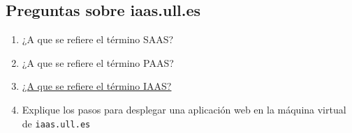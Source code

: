 \subsection{Preguntas sobre
iaas.ull.es}\label{preguntas-sobre-iaas.ull.es}

\begin{enumerate}
\def\labelenumi{\arabic{enumi}.}
\itemsep1pt\parskip0pt
\item
  ¿A que se refiere el término SAAS?
\item
  ¿A que se refiere el término PAAS?
\item
  \href{../recursos/README.md}{¿A que se refiere el término IAAS?}
\item
  Explique los pasos para desplegar una aplicación web en la máquina
  virtual de \texttt{iaas.ull.es}
\end{enumerate}
